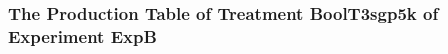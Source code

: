  \begin{frame}
 \fontsize{8pt}{9pt}\selectfont
 \frametitle{ The Production Table of Treatment BoolT3sgp5k of Experiment ExpB }

 \label{ExpBGrammarTable022.tex}  
 \end{frame}

